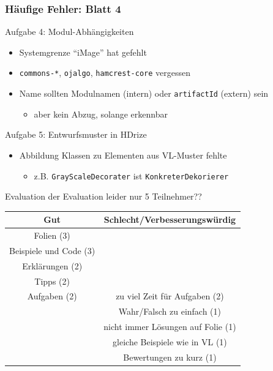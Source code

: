 \documentclass[18pt]{beamer}
\begin{document}
	\begin{frame}
		\frametitle{Häufige Fehler: Blatt 4}
		\begin{block}{Aufgabe 4: Modul-Abhängigkeiten}
			\pause
			\begin{itemize}
				\item Systemgrenze \enquote{iMage} hat gefehlt \pause
				\item \texttt{commons-*}, \texttt{ojalgo}, \texttt{hamcrest-core} vergessen \pause
				\item Name sollten Modulnamen (intern) oder \texttt{artifactId} (extern) sein
				\begin{itemize}
					\item aber kein Abzug, solange erkennbar
				\end{itemize}
			\end{itemize}
		\end{block}
		\pause
		\begin{block}{Aufgabe 5: Entwurfsmuster in HDrize} \pause
			\begin{itemize}
				\item Abbildung Klassen zu Elementen aus VL-Muster fehlte
				\begin{itemize}
					\item z.B. \texttt{GrayScaleDecorater} ist \texttt{KonkreterDekorierer}
				\end{itemize}
			\end{itemize}
		\end{block}
	\end{frame}

\begin{frame}{Evaluation der Evaluation}
	leider nur 5 Teilnehmer??
	\centering
	\begin{table}
		\begin{tabular}{|c|c|}
			\hline 
			Gut & Schlecht/Verbesserungswürdig \\ 
			\hline
			Folien (3) & \\
			Beispiele und Code (3) & \\ 
			Erklärungen (2) & \\
			Tipps (2) & \\
			Aufgaben (2)&  zu viel Zeit für Aufgaben (2)\\ 
			&  Wahr/Falsch zu einfach (1)\\ 
			& nicht immer Lösungen auf Folie (1)\\
			& gleiche Beispiele wie in VL (1) \\
			& Bewertungen zu kurz (1)\\
			\hline 
		\end{tabular} 
	\end{table}
\end{frame}
\end{document}
